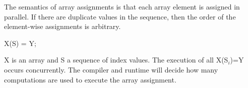 The semantics of array assignments is that each array element is
assigned in parallel. If there are duplicate values in the sequence,
then the order of the element-wise assignments is arbitrary.

\begin{example}
\begin{chapel}
X(S) = Y;
\end{chapel}
X is an array and S a sequence of index values. The execution of all X(S$_i$)=Y
occurs concurrently. The compiler and runtime will decide how many computations
are used to execute the array assignment.
\end{example}

